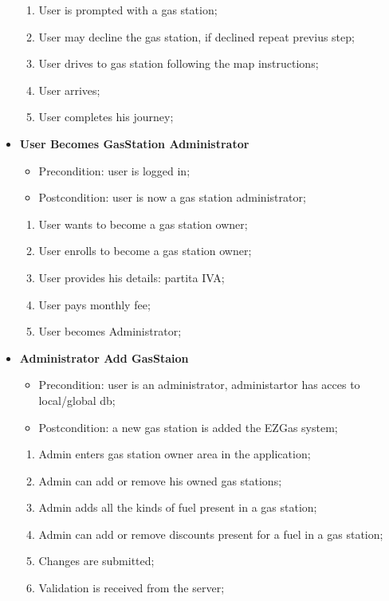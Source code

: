 \documentclass[12pt]{article}
\begin{document}
\begin{itemize}
\begin{enumerate}
      \item User is prompted with a gas station;
      \item User may decline the gas station, if declined repeat previus step;
      \item User drives to gas station following the map instructions;
      \item User arrives;
      \item User completes his journey;
    \end{enumerate}
  \item \textbf{User Becomes GasStation Administrator}
    \begin{itemize}
      \item Precondition: user is logged in;
      \item Postcondition: user is now a gas station administrator;
    \end{itemize}
    \begin{enumerate}
      \item User wants to become a gas station owner;
      \item User enrolls to become a gas station owner;
      \item User provides his details: partita IVA;
      \item User pays monthly fee;
      \item User becomes Administrator;
    \end{enumerate}
  \item \textbf{Administrator Add GasStaion}
    \begin{itemize}
      \item Precondition: user is an administrator, administartor has acces to local/global db;
      \item Postcondition: a new gas station is added the EZGas system;
    \end{itemize}
    \begin{enumerate}
      \item Admin enters gas station owner area in the application;
      \item Admin can add or remove his owned gas stations;
      \item Admin adds all the kinds of fuel present in a gas station;
      \item Admin can add or remove discounts present for a fuel in a gas station;
      \item Changes are submitted;
      \item Validation is received from the server;
    \end{enumerate}
\end{itemize}
\end{document}
